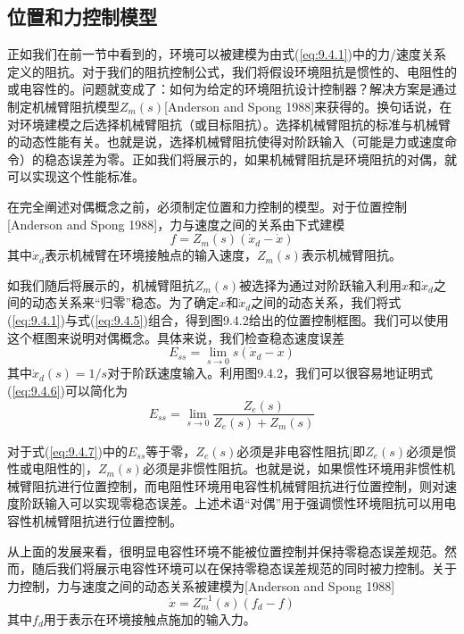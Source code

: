 \documentclass[12pt,a4paper]{ctexart}
\begin{document}
\subsection{位置和力控制模型}

正如我们在前一节中看到的，环境可以被建模为由式(\ref{eq:9.4.1})中的力/速度关系定义的阻抗。对于我们的阻抗控制公式，我们将假设环境阻抗是惯性的、电阻性的或电容性的。问题就变成了：如何为给定的环境阻抗设计控制器？解决方案是通过制定机械臂阻抗模型$Z_m(s)$[Anderson and Spong 1988]来获得的。换句话说，在对环境建模之后选择机械臂阻抗（或目标阻抗）。选择机械臂阻抗的标准与机械臂的动态性能有关。也就是说，选择机械臂阻抗使得对阶跃输入（可能是力或速度命令）的稳态误差为零。正如我们将展示的，如果机械臂阻抗是环境阻抗的对偶，就可以实现这个性能标准。

在完全阐述对偶概念之前，必须制定位置和力控制的模型。对于位置控制[Anderson and Spong 1988]，力与速度之间的关系由下式建模
\begin{equation}\label{eq:9.4.5}
f = Z_m(s)(\dot{x}_d - \dot{x})
\end{equation}
其中$\dot{x}_d$表示机械臂在环境接触点的输入速度，$Z_m(s)$表示机械臂阻抗。

如我们随后将展示的，机械臂阻抗$Z_m(s)$被选择为通过对阶跃输入利用$x$和$\dot{x}_d$之间的动态关系来``归零''稳态。为了确定$x$和$\dot{x}_d$之间的动态关系，我们将式(\ref{eq:9.4.1})与式(\ref{eq:9.4.5})组合，得到图9.4.2给出的位置控制框图。我们可以使用这个框图来说明对偶概念。具体来说，我们检查稳态速度误差
\begin{equation}\label{eq:9.4.6}
E_{ss} = \lim_{s \to 0} s(\dot{x}_d - \dot{x})
\end{equation}
其中$\dot{x}_d(s) = 1/s$对于阶跃速度输入。利用图9.4.2，我们可以很容易地证明式(\ref{eq:9.4.6})可以简化为
\begin{equation}\label{eq:9.4.7}
E_{ss} = \lim_{s \to 0} \frac{Z_e(s)}{Z_e(s) + Z_m(s)}
\end{equation}

对于式(\ref{eq:9.4.7})中的$E_{ss}$等于零，$Z_e(s)$必须是非电容性阻抗[即$Z_e(s)$必须是惯性或电阻性的]，$Z_m(s)$必须是非惯性阻抗。也就是说，如果惯性环境用非惯性机械臂阻抗进行位置控制，而电阻性环境用电容性机械臂阻抗进行位置控制，则对速度阶跃输入可以实现零稳态误差。上述术语``对偶''用于强调惯性环境阻抗可以用电容性机械臂阻抗进行位置控制。

从上面的发展来看，很明显电容性环境不能被位置控制并保持零稳态误差规范。然而，随后我们将展示电容性环境可以在保持零稳态误差规范的同时被力控制。关于力控制，力与速度之间的动态关系被建模为[Anderson and Spong 1988]
\begin{equation}\label{eq:9.4.8}
\dot{x} = Z_m^{-1}(s)(f_d - f)
\end{equation}
其中$f_d$用于表示在环境接触点施加的输入力。
\end{document}
